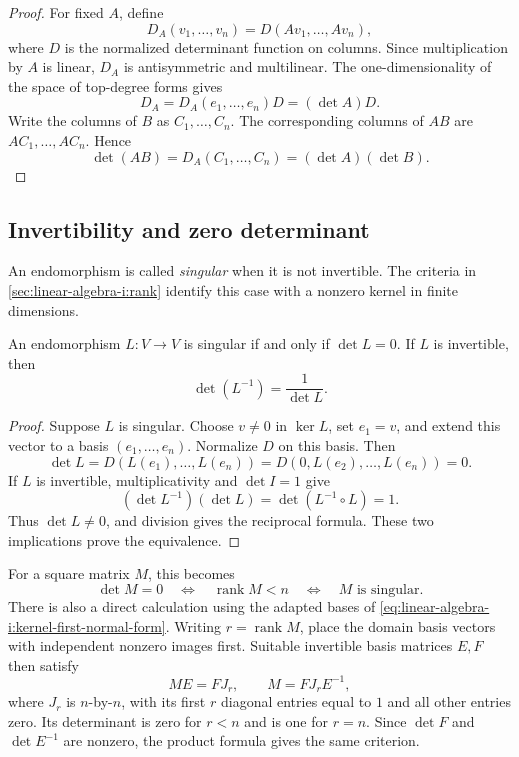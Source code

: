 \begin{proof}
  For fixed \(A\), define
  \[
    D_A(v_1,\ldots,v_n)=D(Av_1,\ldots,Av_n),
  \]
  where \(D\) is the normalized determinant function on columns.
  Since multiplication by \(A\) is linear, \(D_A\) is antisymmetric
  and multilinear. The one-dimensionality of the space of top-degree
  forms gives
  \[
    D_A=D_A(e_1,\ldots,e_n)D=(\det A)D.
  \]
  Write the columns of \(B\) as \(C_1,\ldots,C_n\).
  The corresponding columns of \(AB\) are \(AC_1,\ldots,AC_n\). Hence
  \[
    \det(AB)=D_A(C_1,\ldots,C_n)=(\det A)(\det B).
  \]
\end{proof}

\subsection{Invertibility and zero determinant}

An endomorphism is called \emph{singular} when it is not invertible.
The criteria in \autoref{sec:linear-algebra-i:rank} identify this case
with a nonzero kernel in finite dimensions.

\begin{theorem}
  \label{thm:linear-algebra-i:determinant-invertibility}
  An endomorphism \(L:V\to V\) is singular if and only if \(\det L=0\).
  If \(L\) is invertible, then
  \[
    \det(L^{-1})=\frac{1}{\det L}.
  \]
\end{theorem}

\begin{proof}
  Suppose \(L\) is singular. Choose \(v\ne0\) in \(\ker L\), set
  \(e_1=v\), and extend this vector to a basis \((e_1,\ldots,e_n)\).
  Normalize \(D\) on this basis. Then
  \[
    \det L=D(L(e_1),\ldots,L(e_n))
      =D(0,L(e_2),\ldots,L(e_n))=0.
  \]
  If \(L\) is invertible, multiplicativity and \(\det I=1\) give
  \[
    (\det L^{-1})(\det L)=\det(L^{-1}\circ L)=1.
  \]
  Thus \(\det L\ne0\), and division gives the reciprocal formula.
  These two implications prove the equivalence.
\end{proof}

For a square matrix \(M\), this becomes
\[
  \det M=0\quad\Longleftrightarrow\quad
  \operatorname{rank}M<n\quad\Longleftrightarrow\quad
  M\text{ is singular}.
\]
There is also a direct calculation using the adapted bases of
\autoref{eq:linear-algebra-i:kernel-first-normal-form}.
Writing \(r=\operatorname{rank}M\), place the domain basis vectors
with independent nonzero images first. Suitable invertible basis matrices
\(E,F\) then satisfy
\[
  ME=FJ_r,\qquad M=FJ_rE^{-1},
\]
where \(J_r\) is \(n\)-by-\(n\), with its first \(r\) diagonal entries
equal to \(1\) and all other entries zero. Its determinant is zero for
\(r<n\) and is one for \(r=n\). Since \(\det F\) and \(\det E^{-1}\) are nonzero,
the product formula gives the same criterion.
